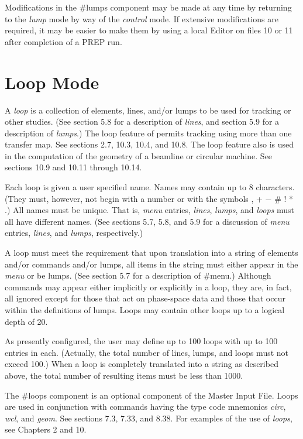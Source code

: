Modifications in the \#lumps component may be made at any time by returning
to the {\em lump} mode by way of the {\em control} mode. If extensive
modifications are required, it may be easier to make them by using a local
Editor on files 10 or 11 after completion of a PREP run.
\vspace{1in}
\pagebreak

\section{Loop Mode} A {\em loop} is a collection of elements, lines, and/or
lumps to be used for tracking or other studies. (See section 5.8 for a
description of {\em lines}, and section 5.9 for a description of {\em
lumps}.) The loop feature of \Mary permits tracking using more than one
transfer map. See sections 2.7, 10.3, 10.4, and 10.8. The loop feature also
is used in the computation of the geometry of a beamline or circular
machine. See sections 10.9 and 10.11 through 10.14.

Each loop is given a user specified name. Names may contain up to 8
characters. (They must, however, not begin with a number or with the
symbols , + $-$ \# ! * .) All names must be unique. That is, {\em menu}
entries, {\em lines}, {\em lumps}, and {\em loops} must all have different
names. (See sections 5.7, 5.8, and 5.9 for a discussion of {\em menu}
entries, {\em lines}, and {\em lumps}, respectively.)

A loop must meet the requirement that upon translation into a string of
elements and/or commands and/or lumps, all items in the string must either
appear in the {\em menu} or be lumps. (See section 5.7 for a description of
\#menu.) Although commands may appear either implicitly or explicitly in a
loop, they are, in fact, all ignored except for those that act on
phase-space data and those that occur within the definitions of lumps.
Loops may contain other loops up to a logical depth of 20.

As presently configured, the user may define up to 100 loops with up to 100
entries in each. (Actually, the total number of lines, lumps, and loops
must not exceed 100.) When a loop is completely translated into a string as
described above, the total number of resulting items must be less than
1000.

The \#loops component is an optional component of the Master Input File.
Loops are used in conjunction with commands having the type code mnemonics
{\em circ}, {\em wcl}, and {\em geom}. See sections 7.3, 7.33, and 8.38.
For examples of the use of {\em loops}, see Chapters 2 and 10.

